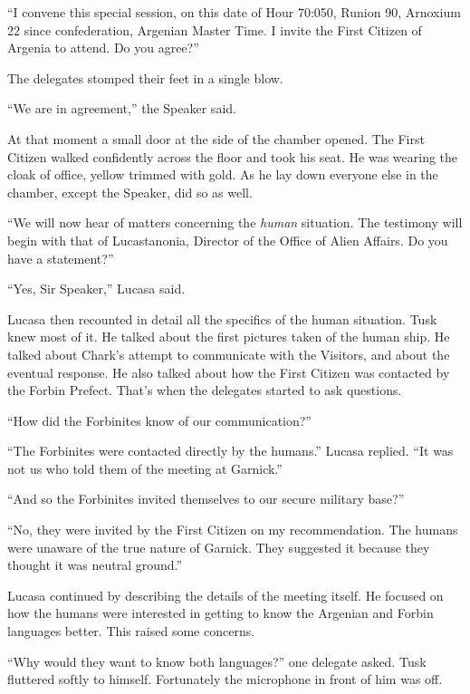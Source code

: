 ``I convene this special session, on this date of Hour 70:050, Runion 90, Arnoxium 22 since
confederation, Argenian Master Time. I invite the First Citizen of Argenia to attend. Do you
agree?''

The delegates stomped their feet in a single blow.

``We are in agreement,'' the Speaker said.

At that moment a small door at the side of the chamber opened. The First Citizen walked
confidently across the floor and took his seat. He was wearing the cloak of office, yellow
trimmed with gold. As he lay down everyone else in the chamber, except the Speaker, did so as
well.


``We will now hear of matters concerning the \textit{human} situation. The testimony will begin
with that of Lucastanonia, Director of the Office of Alien Affairs. Do you have a statement?''

``Yes, Sir Speaker,'' Lucasa said.

Lucasa then recounted in detail all the specifics of the human situation. Tusk knew most of it.
He talked about the first pictures taken of the human ship. He talked about Chark's attempt to
communicate with the Visitors, and about the eventual response. He also talked about how the
First Citizen was contacted by the Forbin Prefect. That's when the delegates started to ask
questions.

``How did the Forbinites know of our communication?''

``The Forbinites were contacted directly by the humans.'' Lucasa replied. ``It was not us who
told them of the meeting at Garnick.''

``And so the Forbinites invited themselves to our secure military base?''

``No, they were invited by the First Citizen on my recommendation. The humans were unaware of
the true nature of Garnick. They suggested it because they thought it was neutral ground.''

Lucasa continued by describing the details of the meeting itself. He focused on how the humans
were interested in getting to know the Argenian and Forbin languages better. This raised some
concerns.

``Why would they want to know both languages?'' one delegate asked. Tusk fluttered softly to
himself. Fortunately the microphone in front of him was off.

